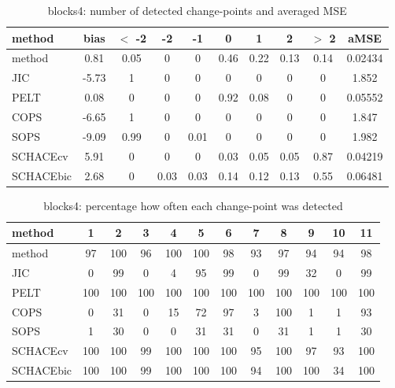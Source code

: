 \begin{table}[ht]
\centering
\begin{tabular}{l|c|ccccccc|c}
  \hline
method & bias & $<$ -2 & -2 & -1 & 0 & 1 & 2 & $>$ 2 & aMSE \\ 
  \hline
method &  0.81 &  0.05 &     0 &     0 &  0.46 &  0.22 &  0.13 &  0.14 & 0.02434 \\ 
  JIC & -5.73 &     1 &     0 &     0 &     0 &     0 &     0 &     0 & 1.852 \\ 
  PELT &  0.08 &     0 &     0 &     0 &  0.92 &  0.08 &     0 &     0 & 0.05552 \\ 
  COPS & -6.65 &     1 &     0 &     0 &     0 &     0 &     0 &     0 & 1.847 \\ 
  SOPS & -9.09 &  0.99 &     0 &  0.01 &     0 &     0 &     0 &     0 & 1.982 \\ 
  SCHACEcv &  5.91 &     0 &     0 &     0 &  0.03 &  0.05 &  0.05 &  0.87 & 0.04219 \\ 
  SCHACEbic &  2.68 &     0 &  0.03 &  0.03 &  0.14 &  0.12 &  0.13 &  0.55 & 0.06481 \\ 
   \hline
\end{tabular}
\caption{blocks4: number of detected change-points and averaged MSE} 
\label{tab:blocks4Njumps}
\end{table}
\begin{table}[ht]
\centering
\begin{tabular}{l|ccccccccccc}
  \hline
method & 1 & 2 & 3 & 4 & 5 & 6 & 7 & 8 & 9 & 10 & 11 \\ 
  \hline
method &     97 &    100 &     96 &    100 &    100 &     98 &     93 &     97 &     94 &     94 &     98 \\ 
  JIC &      0 &     99 &      0 &      4 &     95 &     99 &      0 &     99 &     32 &      0 &     99 \\ 
  PELT &    100 &    100 &    100 &    100 &    100 &    100 &    100 &    100 &    100 &    100 &    100 \\ 
  COPS &      0 &     31 &      0 &     15 &     72 &     97 &      3 &    100 &      1 &      1 &     93 \\ 
  SOPS &      1 &     30 &      0 &      0 &     31 &     31 &      0 &     31 &      1 &      1 &     30 \\ 
  SCHACEcv &    100 &    100 &     99 &    100 &    100 &    100 &     95 &    100 &     97 &     93 &    100 \\ 
  SCHACEbic &    100 &    100 &     99 &    100 &    100 &    100 &     94 &    100 &    100 &     34 &    100 \\ 
   \hline
\end{tabular}
\caption{blocks4: percentage how often each change-point was detected} 
\label{tab:blocks4Detections}
\end{table}
